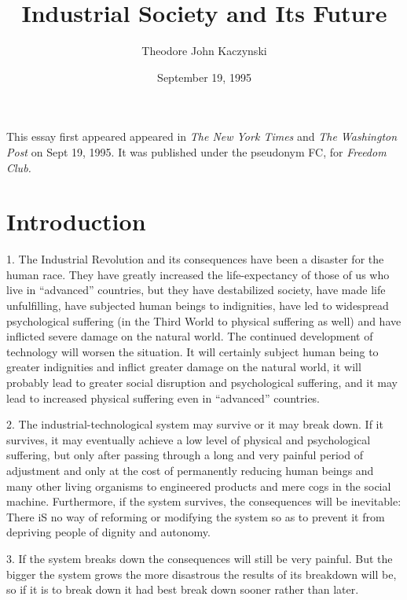 \documentclass{article}
\title{Industrial Society and Its Future}
\author{\small{Theodore John Kaczynski}}
\date{\small{September 19, 1995}}
\begin{document}
\maketitle
\small{This essay first appeared appeared in \textit{The New York Times} and \textit{The Washington Post} on Sept 19, 1995. It was published under the pseudonym FC, for \textit{Freedom Club.}}
\clearpage

\section{Introduction}
\hspace{0.5cm} 1.  The Industrial Revolution and its consequences have been a disaster for the human race.  They have greatly  increased  the  life-expectancy  of  those  of  us  who  live  in  “advanced”  countries, but they  have  destabilized  society,  have  made  life  unfulfilling,  have  subjected  human  beings  to indignities,  have  led  to  widespread  psychological  suffering  (in  the  Third  World  to  physical suffering  as  well)  and  have  inflicted  severe  damage  on  the  natural  world.   The  continued  
development  of  technology  will  worsen  the  situation.   It  will  certainly  subject  human  being to greater indignities and inflict greater damage on the natural world, it will probably lead to greater 
social disruption and psychological suffering, and it may lead to increased physical suffering even 
in “advanced” countries. \vspace{\baselineskip}

2.  The industrial-technological system may survive or it may break down.  If it survives, it may 
eventually  achieve  a  low  level  of  physical  and  psychological  suffering,  but  only  after  passing  through a long and very painful period of adjustment and only at the cost of permanently reducing human beings and many other living organisms to engineered products and mere cogs in the social 
machine.   Furthermore,  if  the  system  survives,  the  consequences  will  be  inevitable:  There  iS no  way of reforming or modifying the system so as to prevent it from depriving people of dignity and 
autonomy. \vspace{\baselineskip}

3.  If the system breaks down the consequences will still be very painful.  But the bigger the system 
grows the more disastrous the results of its breakdown will be, so if it is to break down it had best 
break down sooner rather than later. \vspace{\baselineskip}
\end{document}
